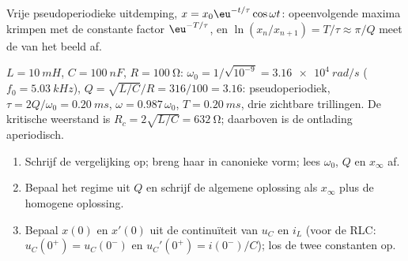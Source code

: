 \begin{omfigure}

{\small Vrije pseudoperiodieke uitdemping, $x = x_0\eu^{-t/\tau}\cos\omega t$:
opeenvolgende maxima krimpen met de constante factor $\eu^{-T/\tau}$, en
$\ln(x_n/x_{n+1}) = T/\tau \approx \pi/Q$ meet de 
van het beeld af.}
\end{omfigure}

\begin{example}\label{ex:b1:transient-regimes:rlcnum}
$L = \qty{10}{mH}$, $C = \qty{100}{nF}$, $R = \qty{100}{\ohm}$:
$\omega_0 = 1/\sqrt{10^{-9}} = \qty{3.16e4}{rad/s}$ ($f_0 =
\qty{5.03}{kHz}$), $Q = \sqrt{L/C}/R = 316/100 = 3.16$: pseudoperiodiek,
$\tau = 2Q/\omega_0 = \qty{0.20}{ms}$, $\omega = 0.987\,\omega_0$,
$T = \qty{0.20}{ms}$, drie zichtbare trillingen. De kritische weerstand
is $R_c = 2\sqrt{L/C} = \qty{632}{\ohm}$; daarboven is de ontlading
aperiodisch.
\end{example}

\begin{method}\label{met:b1:transient-regimes:second}
\begin{enumerate}
  \item Schrijf de vergelijking op; breng haar in canonieke vorm; lees $\omega_0$,
        $Q$ en $x_\infty$ af.
  \item Bepaal het regime uit $Q$ en schrijf de algemene oplossing als
        $x_\infty$ plus de homogene oplossing.
  \item Bepaal $x(0)$ en $x'(0)$ uit de continuïteit van $u_C$ en $i_L$
        (voor de RLC: $u_C(0^+) = u_C(0^-)$ en $u_C'(0^+) = i(0^-)/C$);
        los de twee constanten op.
\end{enumerate}
\end{method}

